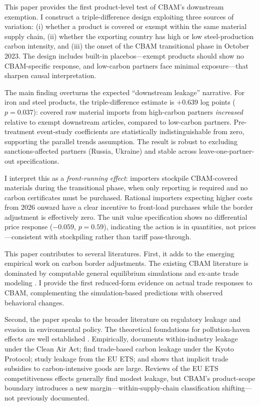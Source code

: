 \documentclass[12pt]{article}
\begin{document}
This paper provides the first product-level test of CBAM's downstream exemption. I construct a triple-difference design exploiting three sources of variation: (i) whether a product is covered or exempt within the same material supply chain, (ii) whether the exporting country has high or low steel-production carbon intensity, and (iii) the onset of the CBAM transitional phase in October 2023. The design includes built-in placebos---exempt products should show no CBAM-specific response, and low-carbon partners face minimal exposure---that sharpen causal interpretation.

The main finding overturns the expected ``downstream leakage'' narrative. For iron and steel products, the triple-difference estimate is $+$0.639 log points ($p = 0.037$): covered raw material imports from high-carbon partners \emph{increased} relative to exempt downstream articles, compared to low-carbon partners. Pre-treatment event-study coefficients are statistically indistinguishable from zero, supporting the parallel trends assumption. The result is robust to excluding sanctions-affected partners (Russia, Ukraine) and stable across leave-one-partner-out specifications.

I interpret this as a \emph{front-running effect}: importers stockpile CBAM-covered materials during the transitional phase, when only reporting is required and no carbon certificates must be purchased. Rational importers expecting higher costs from 2026 onward have a clear incentive to front-load purchases while the border adjustment is effectively zero. The unit value specification shows no differential price response ($-0.059$, $p = 0.59$), indicating the action is in quantities, not prices---consistent with stockpiling rather than tariff pass-through.

This paper contributes to several literatures. First, it adds to the emerging empirical work on carbon border adjustments. The existing CBAM literature is dominated by computable general equilibrium simulations \citep{clausing_etal_2025, branger_quirion_2014, bohringer_etal_2012} and ex-ante trade modeling \citep{larch_wanner_2017, perdana_osseweijer_2021}. I provide the first reduced-form evidence on actual trade responses to CBAM, complementing the simulation-based predictions with observed behavioral changes.

Second, the paper speaks to the broader literature on regulatory leakage and evasion in environmental policy. The theoretical foundations for pollution-haven effects are well established \citep{copeland_taylor_2004, levinson_taylor_2008}. Empirically, \citet{fowlie_2009} documents within-industry leakage under the Clean Air Act; \citet{aichele_felbermayr_2015} find trade-based carbon leakage under the Kyoto Protocol; \citet{naegele_zaklan_2019} study leakage from the EU ETS; and \citet{shapiro_2021} shows that implicit trade subsidies to carbon-intensive goods are large. Reviews of the EU ETS competitiveness effects \citep{martin_muuls_wagner_2016, verde_2020, dechezlepretre_sato_2017} generally find modest leakage, but CBAM's product-scope boundary introduces a new margin---within-supply-chain classification shifting---not previously documented.
\end{document}
